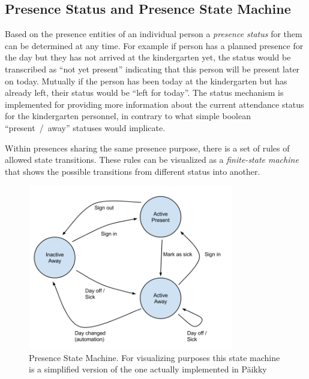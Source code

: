\subsection{Presence Status and Presence State Machine}
\label{subsec:presencestate}

Based on the presence entities of an individual person a \textit{presence status} for them can be determined at any time. For example if person has a planned presence for the day but they has not arrived at the kindergarten yet, the status would be transcribed as ``not yet present'' indicating that this person will be present later on today. Mutually if the person has been today at the kindergarten but has already left, their status would be ``left for today''. The status mechanism is implemented for providing more information about the current attendance status for the kindergarten personnel, in contrary to what simple boolean ``present~/~away'' statuses would implicate.

Within presences sharing the same presence purpose, there is a set of rules of allowed state transitions. These rules can be visualized as a \textit{finite-state machine} that shows the possible transitions from different status into another. 

\begin{figure}[t]
\begin{center}
\includegraphics[width=0.8\textwidth]{assets/statemachine.png}
\end{center}
\caption{Presence State Machine. For visualizing purposes this state machine is a simplified version of the one actually implemented in Päikky}
\label{fig:statemachine}
\end{figure}

